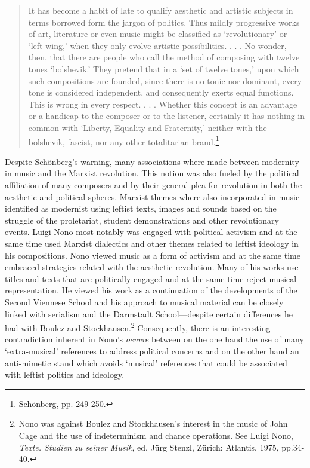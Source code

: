 \begin{quote}
It has become a habit of late to qualify aesthetic and artistic subjects in terms borrowed form the jargon of politics. Thus mildly progressive works of art, literature or even music might be classified as `revolutionary' or `left-wing,' when they only evolve artistic possibilities. . . . No wonder, then, that there are people who call the method of composing with twelve tones `bolshevik.' They pretend that in a `set of twelve tones,' upon which such compositions are founded, since there is no tonic nor dominant, every tone is considered independent, and consequently exerts equal functions. This is wrong in every respect. . . . Whether this concept is an advantage or a handicap to the composer or to the listener, certainly it has nothing in common with `Liberty, Equality and Fraternity,' neither with the bolshevik, fascist, nor any other totalitarian brand.\footnote{Sch\"{o}nberg, pp. 249-250.}
\end{quote}

Despite Sch\"{o}nberg's warning, many associations where made between modernity in music and the Marxist revolution. This notion was also fueled by the political affiliation of many composers and by their general plea for revolution in both the aesthetic and political spheres. Marxist themes where also incorporated in music identified as modernist using leftist texts, images and sounds based on the struggle of the proletariat, student demonstrations and other revolutionary events. Luigi Nono most notably was engaged with political activism and at the same time used Marxist dialectics and other themes related to leftist ideology in his compositions. Nono viewed music as a form of activism and at the same time embraced strategies related with the aesthetic revolution. Many of his works use titles and texts that are politically engaged and at the same time reject musical representation. He viewed his work as a continuation of the developments of the Second Viennese School and his approach to musical material can be closely linked with serialism and the Darmstadt School---despite certain differences he had with Boulez and Stockhausen.\footnote{Nono was against Boulez and Stockhausen's interest in the music of John Cage and the use of indeterminism and chance operations. See Luigi Nono, \emph{Texte. Studien zu seiner Musik}, ed. J\"{u}rg Stenzl, Z\"{u}rich: Atlantis, 1975, pp.34-40.} Consequently, there is an interesting contradiction inherent in Nono's \emph{oeuvre} between on the one hand the use of many `extra-musical' references to address political concerns and on the other hand an anti-mimetic stand which avoids `musical' references that could be associated with leftist politics and ideology. 

